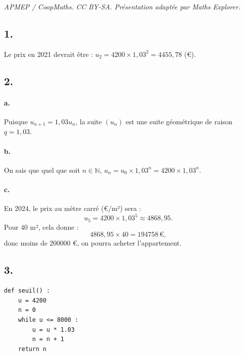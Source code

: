 \documentclass[10pt]{article}
\begin{document}
\noindent\textit{APMEP / CoopMaths. CC BY-SA. Présentation adaptée par Maths Explorer.}\par\medskip
\subsection*{1.}

Le prix en 2021 devrait être : \(u_2 = 4200 \times 1{,}03^2 = 4455{,}78\) (€).

\subsection*{2.}

\paragraph{a.} Puisque \( u_{n + 1} = 1{,}03u_n \), la suite \((u_n)\) est une suite géométrique de raison \(q = 1{,}03\).

\paragraph{b.} On sais que quel que soit \(n \in \mathbb{N}\), \(u_n = u_0 \times 1{,}03^n = 4200 \times 1{,}03^n\).

\paragraph{c.} En 2024, le prix au mètre carré (€/m²) sera :
\[
u_5 = 4200 \times 1{,}03^5 \approx 4868{,}95.
\]
Pour 40 m², cela donne :
\[
4868{,}95 \times 40 = 194758 \, \text{€},
\]
donc moins de 200000 €, on pourra acheter l'appartement.

\subsection*{3.}

\begin{center}
\begin{lstlisting}[style=python]
def seuil() :
    u = 4200
    n = 0
    while u <= 8000 :
        u = u * 1.03
        n = n + 1
    return n
\end{lstlisting}
\end{center}
\end{document}
